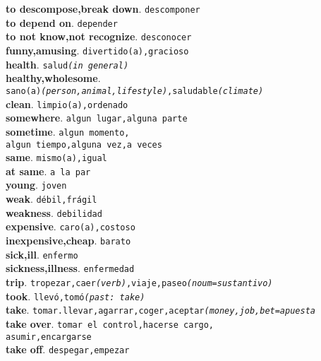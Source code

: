 \documentclass[twocolumn]{article}
\begin{document}
	\textsf{\textbf{to descompose,break down}}. \texttt{descomponer}\\
	\textsf{\textbf{to depend on}}. \texttt{depender}\\
	\textsf{\textbf{to not know,not recognize}}. \texttt{desconocer}\\
	\textsf{\textbf{funny,amusing}}. \texttt{divertido(a),gracioso}\\
	\textsf{\textbf{health}}. \texttt{salud{\scriptsize \textsl{(in general)}}}\\
	\textsf{\textbf{healthy,wholesome}}.\\
			  \texttt{sano(a){\scriptsize \textsl{(person,animal,lifestyle)}},saludable{\scriptsize \textsl{(climate)}}}\\
   \textsf{\textbf{clean}}. \texttt{limpio(a),ordenado}\\
	\textsf{\textbf{somewhere}}. \texttt{algun lugar,alguna parte}\\
	\textsf{\textbf{sometime}}. \texttt{algun momento,\\algun tiempo,alguna vez,a veces}\\
	\textsf{\textbf{same}}. \texttt{mismo(a),igual}\\
	\textsf{\textbf{at same}}. \texttt{a la par}\\
	\textsf{\textbf{young}}. \texttt{joven}\\
	\textsf{\textbf{weak}}. \texttt{d\'ebil,fr\'agil}\\
	\textsf{\textbf{weakness}}. \texttt{debilidad}\\
	\textsf{\textbf{expensive}}. \texttt{caro(a),costoso}\\
	\textsf{\textbf{inexpensive,cheap}}. \texttt{barato}\\
	\textsf{\textbf{sick,ill}}. \texttt{enfermo}\\
	\textsf{\textbf{sickness,illness}}. \texttt{enfermedad}\\
	\textsf{\textbf{trip}}. \texttt{tropezar,caer{\scriptsize \textsl{(verb)}},viaje,paseo{\scriptsize \textsl{(noum=sustantivo)}}}\\
	\textsf{\textbf{took}}. \texttt{llev\'o,tom\'o{\scriptsize \textsl{(past: take)}}}\\
	\textsf{\textbf{take}}. \texttt{tomar.llevar,agarrar,coger,aceptar{\scriptsize \textsl{(money,job,bet=apuesta}}}\\
	\textsf{\textbf{take over}}. \texttt{tomar el control,hacerse cargo,\\asumir,encargarse}\\
	\textsf{\textbf{take off}}. \texttt{despegar,empezar}\\
\end{document}
